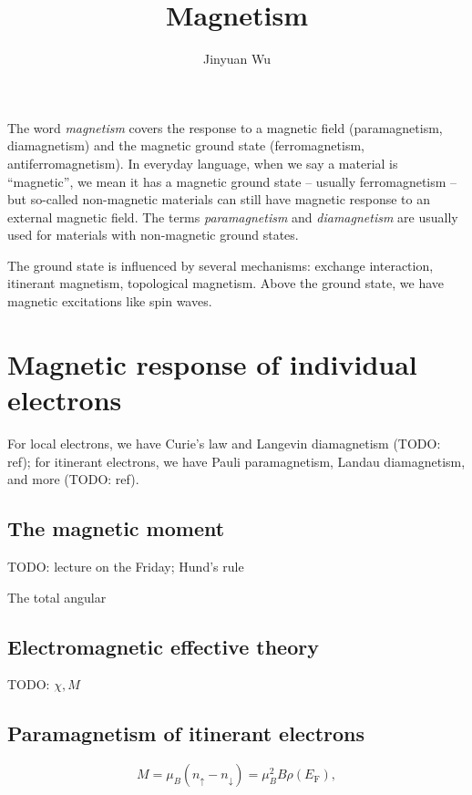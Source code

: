 \documentclass[hyperref, a4paper]{article}
\title{Magnetism}
\author{Jinyuan Wu}
\newcommand*{\term}[1]{\textit{#1}}
\newcommand*{\efermi}{E_{\text{F}}}
\begin{document}
\maketitle

The word \term{magnetism} covers the response to a magnetic field 
(paramagnetism, diamagnetism)
and the magnetic ground state 
(ferromagnetism, antiferromagnetism).
In everyday language,
when we say a material is ``magnetic'',
we mean it has a magnetic ground state -- usually ferromagnetism -- 
but so-called non-magnetic materials 
can still have magnetic response 
to an external magnetic field.
The terms \term{paramagnetism} and \term{diamagnetism} 
are usually used for materials with non-magnetic ground states.

The ground state is influenced by several mechanisms:
exchange interaction, 
itinerant magnetism,
topological magnetism.
Above the ground state, we have magnetic excitations like spin waves.

\section{Magnetic response of individual electrons}

For local electrons, 
we have Curie's law and Langevin diamagnetism (TODO: ref);
for itinerant electrons,
we have Pauli paramagnetism,
Landau diamagnetism, and more (TODO: ref). 

\subsection{The magnetic moment}

TODO: lecture on the Friday; Hund's rule 

The total angular

\subsection{Electromagnetic effective theory}

TODO: $\chi, M$

\subsection{Paramagnetism of itinerant electrons}

\begin{equation}
    M = \mu_{B} (n_\uparrow - n_\downarrow) = \mu_B^2 B \rho(\efermi),
\end{equation}
\end{document}
